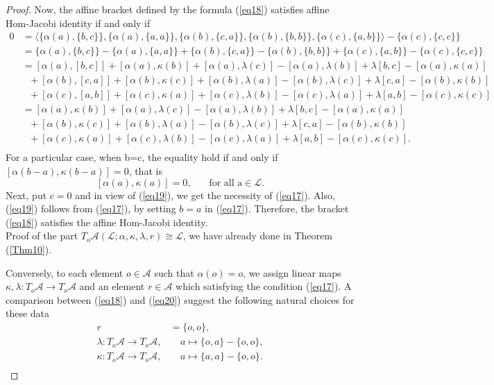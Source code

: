 \documentclass[14pt]{article}
\theoremstyle{Definition}
\theoremstyle{remark}
\begin{document}
\begin{proof}
Now, the affine bracket defined by the formula (\ref{eq18}) satisfies affine Hom-Jacobi identity if and only if
\begin{align*}
0&=\langle\{\alpha(a),\{b,c\}\},\{\alpha( a),\{a,a\}\},\{\alpha(b),\{c,a\}\},\{\alpha(b),\{b,b\}\},\{\alpha(c),\{a,b\}\}\rangle-\{\alpha(c),\{c,c\}\}\\
&=\{\alpha(a),\{b,c\}\}-\{\alpha( a),\{a,a\}\}+\{\alpha(b),\{c,a\}\}-\{\alpha(b),\{b,b\}\}+\{\alpha(c),\{a,b\}\}-\{\alpha(c),\{c,c\}\}\\
&=[\alpha(a),[b,c]]+[\alpha(a),\kappa(b)]+[\alpha(a),\lambda(c)]-[\alpha(a),\lambda(b)]+\lambda[b,c]-[\alpha(a),\kappa(a)]\\
&~~~+[\alpha(b),[c,a]]+[\alpha(b),\kappa(c)]+[\alpha(b),\lambda(a)]-[\alpha(b),\lambda(c)]+\lambda[c,a]-[\alpha(b),\kappa(b)]\\
&~~~+[\alpha(c),[a,b]]+[\alpha(c),\kappa(a)]+[\alpha(c),\lambda(b)]-[\alpha(c),\lambda(a)]+\lambda[a,b]-[\alpha(c),\kappa(c)]\\
&=[\alpha(a),\kappa(b)]+[\alpha(a),\lambda(c)]-[\alpha(a),\lambda(b)]+\lambda[b,c]-[\alpha(a),\kappa(a)]\\
&~~~+[\alpha(b),\kappa(c)]+[\alpha(b),\lambda(a)]-[\alpha(b),\lambda(c)]+\lambda[c,a]-[\alpha(b),\kappa(b)]\\
&~~~+[\alpha(c),\kappa(a)]+[\alpha(c),\lambda(b)]-[\alpha(c),\lambda(a)]+\lambda[a,b]-[\alpha(c),\kappa(c)].\\
\end{align*}
For a particular case, when b=c, the equality hold if and only if $[\alpha(b-a),\kappa(b-a)]=0$, that is
\begin{equation}\label{eq19}
[\alpha(a),\kappa(a)]=0,~~~~~~~~\text{for all a} \in \mathcal{L}.
\end{equation}
Next, put $c=0$ and in view of (\ref{eq19}), we get the necessity of (\ref{eq17}). Also, (\ref{eq19}) follows from (\ref{eq17}), by setting $b=a$ in (\ref{eq17}). Therefore, the bracket (\ref{eq18}) satisfies the affine Hom-Jacobi identity.\\
Proof of the part $T_{o}\mathcal{A}(\mathcal{L};\alpha,\kappa,\lambda,r)\cong\mathcal{L}$, we have already done in Theorem (\ref{Thm10}).

Conversely, to each element $o\in \mathcal{A}$ such that $\alpha(o)=o$, we assign linear maps $\kappa,\lambda:T_{o}\mathcal{A}\rightarrow T_{o}\mathcal{A}$ and an element $r\in \mathcal{A}$ which satisfying the condition (\ref{eq17}). A comparison between (\ref{eq18}) and (\ref{eq20}) suggest the following natural choices for these data
\begin{align*}
r&=\{o,o\},\\
\lambda:T_{o}\mathcal{A}\rightarrow T_{o}\mathcal{A},&~~~~~a\mapsto\{o,a\}-\{o,o\},\\
\kappa:T_{o}\mathcal{A}\rightarrow T_{o}\mathcal{A},&~~~~~a\mapsto\{a,a\}-\{o,o\}.\\
\end{align*}


\end{proof}
\end{document}
